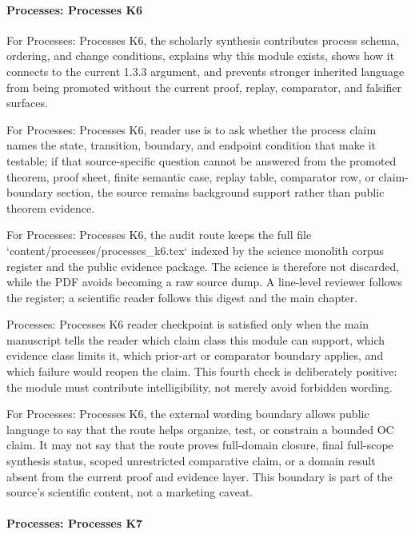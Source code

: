 \paragraph{Processes: Processes K6}

For Processes: Processes K6, the scholarly synthesis contributes process schema, ordering, and change conditions, explains why this module exists, shows how it connects to the current 1.3.3 argument, and prevents stronger inherited language from being promoted without the current proof, replay, comparator, and falsifier surfaces.


For Processes: Processes K6, reader use is to ask whether the process claim names the state, transition, boundary, and endpoint condition that make it testable; if that source-specific question cannot be answered from the promoted theorem, proof sheet, finite semantic case, replay table, comparator row, or claim-boundary section, the source remains background support rather than public theorem evidence.


For Processes: Processes K6, the audit route keeps the full file `content/processes/processes\_k6.tex` indexed by the science monolith corpus register and the public evidence package. The science is therefore not discarded, while the PDF avoids becoming a raw source dump. A line-level reviewer follows the register; a scientific reader follows this digest and the main chapter.


Processes: Processes K6 reader checkpoint is satisfied only when the main manuscript tells the reader which claim class this module can support, which evidence class limits it, which prior-art or comparator boundary applies, and which failure would reopen the claim. This fourth check is deliberately positive: the module must contribute intelligibility, not merely avoid forbidden wording.


For Processes: Processes K6, the external wording boundary allows public language to say that the route helps organize, test, or constrain a bounded OC claim. It may not say that the route proves full-domain closure, final full-scope synthesis status, scoped unrestricted comparative claim, or a domain result absent from the current proof and evidence layer. This boundary is part of the source's scientific content, not a marketing caveat.


\paragraph{Processes: Processes K7}

